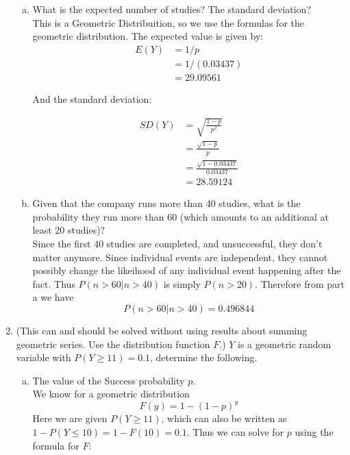 \documentclass{scrartcl}
\begin{document}
\begin{enumerate}
\begin{enumerate}[a)]
  \item What is the expected number of studies? The standard deviation?\\

    This is a Geometric Distribuition, so we use the formulas for the geometric distribution. The expected value is given by:
    \begin{align*}
      E(Y) &= 1/p\\
      &= 1/(0.03437)\\
      &= 29.09561
    \end{align*}

    And the standard deviation:

    \begin{align*}
      SD(Y) &= \sqrt{\frac{1-p}{p^2}}\\
      &= \frac{\sqrt{1-p}}{p}\\
      &= \frac{\sqrt{1-0.03437}}{0.03437}\\
      &= 28.59124
    \end{align*}
  \item Given that the company runs more than 40 studies, what is the probability they run more than 60 (which amounts to an additional at least 20 studies)?\\

    Since the first 40 studies are completed, and unsuccessful, they don't matter anymore. Since individual events are independent, they cannot possibly change the likeihood of any individual event happening after the fact. Thus $P(n > 60 | n > 40)$ is simply $P(n > 20)$. Therefore from part a we have $$P(n > 60 | n > 40) = 0.496844$$

\end{enumerate}
\pagebreak

\item (This can and should be solved without using results about summing geometric series. Use the distribution function $F$.) $Y$ is a geometric random variable with $P(Y \ge 11) = 0.1$, determine the following.

\begin{enumerate}[a)]
\item The value of the Success probability $p$.\\

We know for a geometric distribution $$F(y) = 1 - (1 - p)^y$$ Here we are given $P(Y \ge 11)$, which can also be written as $1 - P(Y \le 10) = 1 - F(10) = 0.1$. Thus we can solve for $p$ using the formula for $F$:


\end{enumerate}
\end{enumerate}
\end{document}
